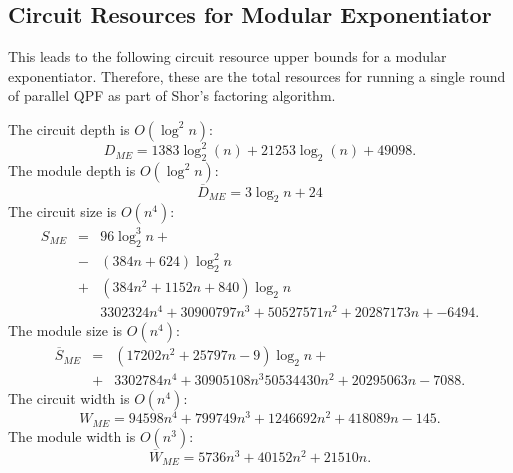 \subsection{Circuit Resources for Modular Exponentiator}
\label{subsec:modexp-resources}

This leads to the following circuit resource upper bounds for a modular exponentiator. Therefore, these are the total resources for running a
single round of parallel QPF as part of Shor's factoring algorithm.

The circuit depth is $O(\log^2 n)$:
\begin{equation}
D_{ME} = 1383\log_2^2(n) + 21253\log_2(n) + 49098\text{.}
\end{equation}
%
The module depth is $O(\log^2 n)$:
%
\begin{equation}
\overline{D}_{ME} = 3\log_2 n + 24
\end{equation}
%
The circuit size is $O(n^4)$:
%
\begin{eqnarray}
S_{ME} & = & 96 \log_2^3 n + \nonumber \\
       & - & (384n + 624)\log_2^2 n \nonumber \\
       & + & (384n^2 + 1152n + 840) \log_2 n \nonumber \\
       &   & 3302324 n^4 + 30900797 n^3 + 50527571 n^2  + 20287173 n + 
  -6494\text{.}
\end{eqnarray}
%
The module size is $O(n^4)$:
%
\begin{eqnarray}
\overline{S}_{ME} & = & (17202 n^2 + 25797 n - 9) \log_2 n + \nonumber \\
                  & + & 3302784 n^4 + 30905108 n^3 50534430 n^2 + 20295063 n - 7088 \text{.}
\end{eqnarray}
%
The circuit width is $O(n^4)$:
%
\begin{equation}
W_{ME} = 94598n^4 + 799749 n^3 + 1246692 n^2 + 418089 n - 145\text{.}
\end{equation}
%
The module width is $O(n^3)$:
%
\begin{equation}
\overline{W}_{ME} = 5736 n^3 + 40152 n ^2 + 21510 n\text{.}
\end{equation}